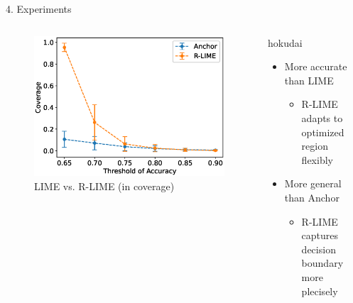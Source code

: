 \documentclass[unicode]{beamer}
\begin{document}
\begin{frame}
\begin{columns}[t]
\begin{column}{\lcol\textwidth}
\begin{block}{4. Experiments}
\begin{columns}
\begin{column}{\lcol\textwidth}
\begin{columns}[t]
\begin{column}{.491\textwidth}
\begin{figure}
									\includegraphics[width=.88\textwidth]{src/experiments/exp2/comp_cov}
									\caption{LIME vs. R-LIME (in coverage)}
								\end{figure}
							\end{column}
						\end{columns}
					\end{column}
					\begin{column}{\rcol\textwidth}
						\vspace{0.5em}
						\begin{beamercolorbox}[colsep=0.1cm,rounded=true,shadow=true]{hokudai}
							\begin{itemize}
								\setlength{\itemsep}{0.3em}
								\setlength{\parskip}{0.2em}
								\item More accurate than LIME
								      \begin{itemize}
									      \item R-LIME adapts to optimized region flexibly
								      \end{itemize}
								\item More general than Anchor
								      \begin{itemize}
									      \item R-LIME captures decision boundary more plecisely
								      \end{itemize}
							\end{itemize}
						\end{beamercolorbox}
					\end{column}
				\end{columns}
			\end{block}
		\end{column}
		\begin{column}{\rcol\textwidth}

\end{column}
\end{columns}
\end{frame}
\end{document}
